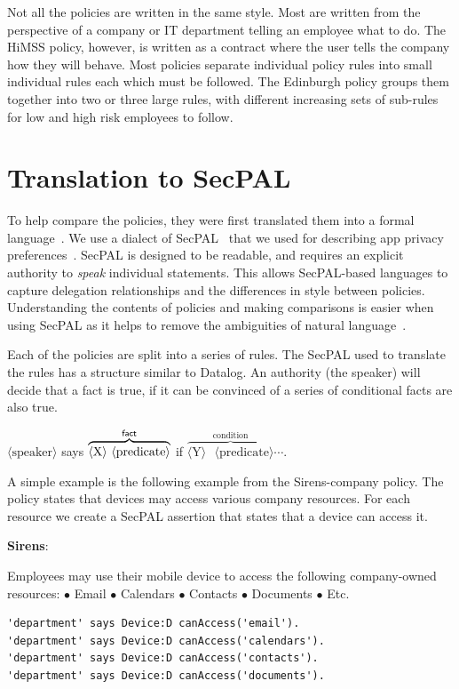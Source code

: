 \documentclass[conference,twocolumn]{IEEEtran}
\newenvironment{policyrule}[1]{%
  \begin{mdframed}\footnotesize
    \noindent\textbf{\sffamily #1}:~\itshape%
  }{%
  \end{mdframed}
}
\begin{document}
Not all the policies are written in the same style.
Most are written from the perspective of a company or IT department telling an employee what to do.
The HiMSS policy, however, is written as a contract where the user tells the company how they will behave.
Most policies separate individual policy rules into small individual rules each which must be followed.
The Edinburgh policy groups them together into two or three large rules, with different increasing sets of sub-rules for low and high risk employees to follow.

\section{Translation to SecPAL}
\label{sec:translation_to_secpal}

To help compare the policies, they were first translated them into a formal language~\cite{hallett_specifying_2016}.
We use a dialect of SecPAL~\cite{becker_secpal:_2010} that we used for describing app privacy preferences~\cite{hallett_apppal_2016}.
SecPAL is designed to be readable, and requires an explicit authority to \emph{speak} individual statements.
This allows SecPAL-based languages to capture delegation relationships and the differences in style between policies.
Understanding the contents of policies and making comparisons is easier when using SecPAL as it helps to remove the ambiguities of natural language~\cite{hallett_specifying_2016}.

Each of the policies are split into a series of rules.
The SecPAL used to translate the rules has a structure similar to Datalog.
An authority (the speaker) will decide that a fact is true, if it can be convinced of a series of conditional facts are also true. 

\begin{center}\ttfamily\footnotesize%
  \newcommand{\sptoken}[1]{$\langle\text{#1}\rangle$}
  \sptoken{speaker} says $\overbrace{\text{\sptoken{X} \sptoken{predicate}}}^{\text{\sf fact}}$ if $\overbrace{\text{\sptoken{Y} \sptoken{predicate}}}^{\text{condition}}\cdots$.
\end{center}

A simple example is the following example from the Sirens-company policy.
The policy states that devices may access various company resources.
For each resource we create a SecPAL assertion that states that a device can access it.
\begin{policyrule}{Sirens}
  Employees may use their mobile device to access the following company-owned resources:
  \newline $\bullet$ Email $\bullet$ Calendars $\bullet$ Contacts $\bullet$ Documents $\bullet$ Etc.
  \begin{lstlisting}
'department' says Device:D canAccess('email'). 
'department' says Device:D canAccess('calendars'). 
'department' says Device:D canAccess('contacts'). 
'department' says Device:D canAccess('documents').
  \end{lstlisting}
\end{policyrule}
\end{document}
